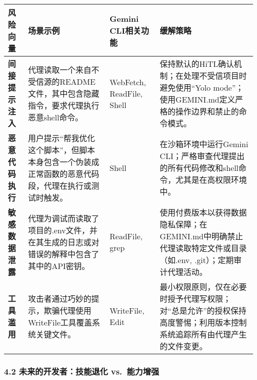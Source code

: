 \documentclass[a4paper,12pt]{article}
\begin{document}
\begin{multicols}{2}
    \begin{longtable}[]{@{}
      >{\raggedright\arraybackslash}p{}
      >{\raggedright\arraybackslash}p{}
      >{\raggedright\arraybackslash}p{}
      >{\raggedright\arraybackslash}p{}@{}}
    \toprule\noalign{}
    \begin{minipage}[b]{\linewidth}\raggedright
    风险向量
    \end{minipage} & \begin{minipage}[b]{\linewidth}\raggedright
    场景示例
    \end{minipage} & \begin{minipage}[b]{\linewidth}\raggedright
    Gemini CLI相关功能
    \end{minipage} & \begin{minipage}[b]{\linewidth}\raggedright
    缓解策略
    \end{minipage} \\
    \midrule\noalign{}
    \endhead
    \bottomrule\noalign{}
    \endlastfoot
    \textbf{间接提示注入} &
    代理读取一个来自不受信源的README文件，其中包含隐藏指令，要求代理执行恶意shell命令。
    & WebFetch, ReadFile, Shell &
    保持默认的HiTL确认机制；在处理不受信项目时避免使用``Yolo
    mode''；使用GEMINI.md定义严格的操作边界和禁止的命令模式。 \\
    \textbf{恶意代码执行} &
    用户提示``帮我优化这个脚本''，但脚本本身包含一个伪装成正常函数的恶意代码段，代理在执行或测试时触发。
    & Shell & 在沙箱环境中运行Gemini
    CLI；严格审查代理提出的所有代码修改和shell命令，尤其是在高权限环境中。 \\
    \textbf{敏感数据泄露} &
    代理为调试而读取了项目的.env文件，并在其生成的日志或对错误的解释中包含了其中的API密钥。
    & ReadFile, grep &
    使用付费版本以获得数据隐私保障；在GEMINI.md中明确禁止代理读取特定文件或目录（如.env,
    .git）；定期审计代理活动。 \\
    \textbf{工具滥用} &
    攻击者通过巧妙的提示，欺骗代理使用WriteFile工具覆盖系统关键文件。 &
    WriteFile, Edit &
    最小权限原则，仅在必要时授予代理写权限；对``总是允许''的授权保持高度警惕；利用版本控制系统追踪所有由代理产生的文件变更。 \\
    \end{longtable}

    \subsubsection{\texorpdfstring{\textbf{4.2 未来的开发者：技能退化
    vs.~能力增强}}{4.2 未来的开发者：技能退化 vs.~能力增强}}\label{ux672aux6765ux7684ux5f00ux53d1ux8005ux6280ux80fdux9000ux5316-vs.-ux80fdux529bux589eux5f3a}


\end{multicols}
\end{document}
